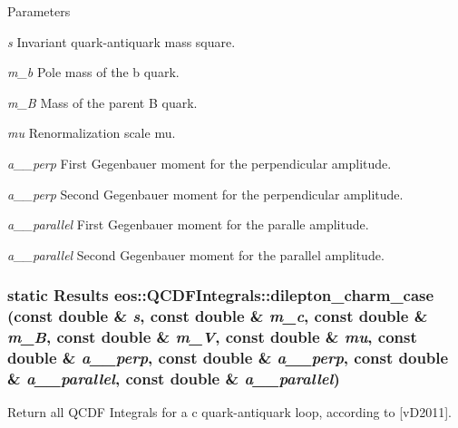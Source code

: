 \begin{DoxyParams}{Parameters}
\item[{\em s}]Invariant quark-\/antiquark mass square. \item[{\em m\_\-b}]Pole mass of the b quark. \item[{\em m\_\-B}]Mass of the parent B quark. \item[{\em mu}]Renormalization scale mu. \item[{\em a\_\-1\_\-perp}]First Gegenbauer moment for the perpendicular amplitude. \item[{\em a\_\-2\_\-perp}]Second Gegenbauer moment for the perpendicular amplitude. \item[{\em a\_\-1\_\-parallel}]First Gegenbauer moment for the paralle amplitude. \item[{\em a\_\-2\_\-parallel}]Second Gegenbauer moment for the parallel amplitude. \end{DoxyParams}
\hypertarget{classeos_1_1QCDFIntegrals_afd6226e6800deeec288306c490da5893}{
\subsubsection[{dilepton\_\-charm\_\-case}]{\setlength{\rightskip}{0pt plus 5cm}static {\bf Results} eos::QCDFIntegrals::dilepton\_\-charm\_\-case (const double \& {\em s}, \/  const double \& {\em m\_\-c}, \/  const double \& {\em m\_\-B}, \/  const double \& {\em m\_\-V}, \/  const double \& {\em mu}, \/  const double \& {\em a\_\_\-perp}, \/  const double \& {\em a\_\_\-perp}, \/  const double \& {\em a\_\_\-parallel}, \/  const double \& {\em a\_\_\-parallel})}}
\label{classeos_1_1QCDFIntegrals_afd6226e6800deeec288306c490da5893}
Return all QCDF Integrals for a c quark-\/antiquark loop, according to \mbox{[}vD2011\mbox{]}.


